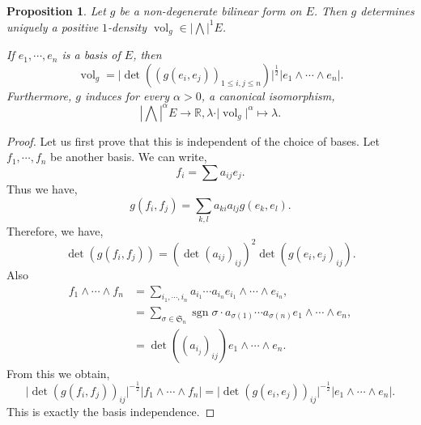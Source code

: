 \documentclass[10pt]{article}
\newtheorem{proposition}{Proposition}[section]
\DeclareMathOperator{\sgn}{sgn}
\DeclareMathOperator{\vol}{vol}
\newcommand{\R}[0]{\mathbb{R}}
\begin{document}
\begin{proposition}
  \label{proposition_11_6}
  Let $g$ be a non-degenerate bilinear form on $E$. Then $g$ determines uniquely a positive $1$-density $\vol_g\in\left\vert\bigwedge\right\vert^1 E$. 
  \par If $e_1,\cdots,e_n$ is a basis of $E$, then 
  \begin{equation*}
    \vol_g = \vert\det((g(e_i,e_j))_{1\leq i,j\leq n})\vert^{{\frac 1 2}}\vert e_1\wedge\cdots\wedge e_n\vert.
  \end{equation*}
  Furthermore, $g$ induces for every $\alpha>0$, a canonical isomorphism,
  \begin{equation*}
    \left\vert\bigwedge\right\vert^\alpha E\to \R, \lambda\cdot\vert\vol_g\vert^\alpha\mapsto\lambda.
  \end{equation*}
\end{proposition}

\begin{proof}
  Let us first prove that this is independent of the choice of bases. Let $f_1,\cdots,f_n$ be another basis. We can write,
  \begin{equation*}
    f_i = \sum a_{ij}e_j.
  \end{equation*}
  Thus we have,
  \begin{equation*}
    g(f_i,f_j) = \sum_{k,l}a_{ki}a_{lj}g(e_k,e_l).
  \end{equation*}
  Therefore, we have,
  \begin{equation*}
    \det(g(f_i,f_j)) = (\det(a_{ij})_{ij})^2\det(g(e_i,e_j)_{ij}).
  \end{equation*}
  Also 
  \begin{align*}
    f_1\wedge\cdots\wedge f_n & = \sum_{i_1,\cdots,i_n}a_{i_1}\cdots a_{i_n}e_{i_1}\wedge\cdots\wedge e_{i_n},\\
    & = \sum_{\sigma\in\mathfrak{S}_n}\sgn\sigma \cdot a_{\sigma(1)}\cdots a_{\sigma(n)}e_1\wedge\cdots\wedge e_n,\\
    & = \det((a_{i_j})_{ij})e_1\wedge\cdots\wedge e_n.
  \end{align*}
  From this we obtain,
  \begin{equation*}
    \vert\det (g(f_i,f_j))_{ij}\vert^{-{\frac 1 2}}\vert f_1\wedge\cdots \wedge f_n\vert =\vert\det (g(e_i,e_j))_{ij}\vert^{-{\frac 1 2}}\vert e_1\wedge\cdots \wedge e_n\vert.
  \end{equation*}
  This is exactly the basis independence.
\end{proof}
\end{document}
